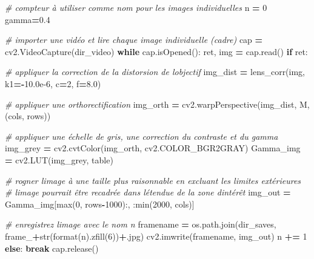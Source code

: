 \documentclass[
]{article}
\newenvironment{Shaded}{\begin{snugshade}}{\end{snugshade}}
\newcommand{\BuiltInTok}[1]{#1}
\newcommand{\CommentTok}[1]{\textcolor[rgb]{0.56,0.35,0.01}{\textit{#1}}}
\newcommand{\ControlFlowTok}[1]{\textcolor[rgb]{0.13,0.29,0.53}{\textbf{#1}}}
\newcommand{\DecValTok}[1]{\textcolor[rgb]{0.00,0.00,0.81}{#1}}
\newcommand{\FloatTok}[1]{\textcolor[rgb]{0.00,0.00,0.81}{#1}}
\newcommand{\NormalTok}[1]{#1}
\newcommand{\OperatorTok}[1]{\textcolor[rgb]{0.81,0.36,0.00}{\textbf{#1}}}
\newcommand{\StringTok}[1]{\textcolor[rgb]{0.31,0.60,0.02}{#1}}
\begin{document}
\begin{Shaded}
\begin{Highlighting}[]
\CommentTok{\# compteur à utiliser comme nom pour les images individuelles}
\NormalTok{n }\OperatorTok{=} \DecValTok{0}
\NormalTok{gamma}\OperatorTok{=}\FloatTok{0.4}

\CommentTok{\# importer une vidéo et lire chaque image individuelle (cadre)}
\NormalTok{cap }\OperatorTok{=}\NormalTok{ cv2.VideoCapture(dir\_video)}
\ControlFlowTok{while}\NormalTok{ cap.isOpened():}
\NormalTok{    ret, img }\OperatorTok{=}\NormalTok{ cap.read()}
    \ControlFlowTok{if}\NormalTok{ ret:}

        \CommentTok{\# appliquer la correction de la distorsion de l\textquotesingle{}objectif}
\NormalTok{        img\_dist }\OperatorTok{=}\NormalTok{ lens\_corr(img, k1}\OperatorTok{={-}}\FloatTok{10.0e{-}6}\NormalTok{, c}\OperatorTok{=}\DecValTok{2}\NormalTok{, f}\OperatorTok{=}\FloatTok{8.0}\NormalTok{)}

        \CommentTok{\# appliquer une orthorectification}
\NormalTok{        img\_orth }\OperatorTok{=}\NormalTok{ cv2.warpPerspective(img\_dist, M, (cols, rows))}

        \CommentTok{\# appliquer une échelle de gris, une correction du contraste et du gamma}
\NormalTok{        img\_grey }\OperatorTok{=}\NormalTok{ cv2.cvtColor(img\_orth, cv2.COLOR\_BGR2GRAY)}
\NormalTok{        Gamma\_img }\OperatorTok{=}\NormalTok{ cv2.LUT(img\_grey, table)}

        \CommentTok{\# rogner l\textquotesingle{}image à une taille plus raisonnable en excluant les limites extérieures}
        \CommentTok{\# l\textquotesingle{}image pourrait être recadrée dans l\textquotesingle{}étendue de la zone d\textquotesingle{}intérêt}
\NormalTok{        img\_out }\OperatorTok{=}\NormalTok{ Gamma\_img[}\BuiltInTok{max}\NormalTok{(}\DecValTok{0}\NormalTok{, rows}\OperatorTok{{-}}\DecValTok{1000}\NormalTok{):, :}\BuiltInTok{min}\NormalTok{(}\DecValTok{2000}\NormalTok{, cols)]}

        \CommentTok{\# enregistrez l\textquotesingle{}image avec le nom \textquotesingle{}n\textquotesingle{}}
\NormalTok{        framename }\OperatorTok{=}\NormalTok{ os.path.join(dir\_saves,}
                                 \StringTok{\textquotesingle{}frame\_\textquotesingle{}}\OperatorTok{+}\BuiltInTok{str}\NormalTok{(}\BuiltInTok{format}\NormalTok{(n).zfill(}\DecValTok{6}\NormalTok{))}\OperatorTok{+}\StringTok{\textquotesingle{}.jpg\textquotesingle{}}\NormalTok{)}
\NormalTok{        cv2.imwrite(framename, img\_out)}
\NormalTok{        n }\OperatorTok{+=} \DecValTok{1}
    \ControlFlowTok{else}\NormalTok{:}
        \ControlFlowTok{break}
\NormalTok{cap.release()}
\end{Highlighting}
\end{Shaded}
\end{document}
